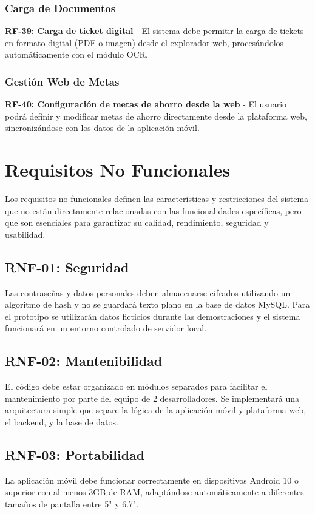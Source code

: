 \subsubsection{Carga de Documentos}
\textbf{RF-39: Carga de ticket digital} - El sistema debe permitir la carga de tickets en formato digital (PDF o imagen) desde el explorador web, procesándolos automáticamente con el módulo OCR.

\subsubsection{Gestión Web de Metas}
\textbf{RF-40: Configuración de metas de ahorro desde la web} - El usuario podrá definir y modificar metas de ahorro directamente desde la plataforma web, sincronizándose con los datos de la aplicación móvil.

\section{Requisitos No Funcionales}

Los requisitos no funcionales definen las características y restricciones del sistema que no están directamente relacionadas con las funcionalidades específicas, pero que son esenciales para garantizar su calidad, rendimiento, seguridad y usabilidad.

\subsection{RNF-01: Seguridad}
Las contraseñas y datos personales deben almacenarse cifrados utilizando un algoritmo de hash y no se guardará texto plano en la base de datos MySQL. Para el prototipo se utilizarán datos ficticios durante las demostraciones y el sistema funcionará en un entorno controlado de servidor local.

\subsection{RNF-02: Mantenibilidad}
El código debe estar organizado en módulos separados para facilitar el mantenimiento por parte del equipo de 2 desarrolladores. Se implementará una arquitectura simple que separe la lógica de la aplicación móvil y plataforma web, el backend, y la base de datos.

\subsection{RNF-03: Portabilidad}
La aplicación móvil debe funcionar correctamente en dispositivos Android 10 o superior con al menos 3GB de RAM, adaptándose automáticamente a diferentes tamaños de pantalla entre 5" y 6.7".

